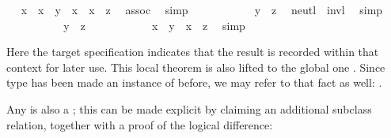 \begin{isabellebody}
\ \isamarkupfalse%
\ {\isachardoublequoteopen}{\isacharparenleft}x\isactrlloc {\isasymdiv}\ \isactrlloc {\isasymotimes}\ x{\isacharparenright}\ \isactrlloc {\isasymotimes}\ y\ {\isacharequal}\ {\isacharparenleft}x\isactrlloc {\isasymdiv}\ \isactrlloc {\isasymotimes}\ x{\isacharparenright}\ \isactrlloc {\isasymotimes}\ z{\isachardoublequoteclose}\ \isamarkupfalse%
\ assoc\ \isamarkupfalse%
\ simp\isanewline
\ \ \ \ \ \ \ \ \isamarkupfalse%
\ \isamarkupfalse%
\ {\isachardoublequoteopen}y\ {\isacharequal}\ z{\isachardoublequoteclose}\ \isamarkupfalse%
\ neutl\ \ invl\ \isamarkupfalse%
\ simp\isanewline
\ \ \ \ \isamarkupfalse%
\isanewline
\ \ \ \ \isamarkupfalse%
\ {\isachardoublequoteopen}y\ {\isacharequal}\ z{\isachardoublequoteclose}\isanewline
\ \ \ \ \ \ \ \ \isamarkupfalse%
\ \isamarkupfalse%
\ {\isachardoublequoteopen}x\ \isactrlloc {\isasymotimes}\ y\ {\isacharequal}\ x\ \isactrlloc {\isasymotimes}\ z{\isachardoublequoteclose}\ \isamarkupfalse%
\ simp\isanewline
\ \ \ \ \isamarkupfalse%
%
\endisatagproof
{\isafoldproof}%
%
\isadelimproof
%
\endisadelimproof
%
\begin{isamarkuptext}%
\noindent Here the  target specification
  indicates that the result is recorded within that context for later
  use.  This local theorem is also lifted to the global one  .  Since type  has been made an instance of
   before, we may refer to that fact as well: .%
\end{isamarkuptext}%
\isamarkuptrue%
%
\isamarkuptrue%
%
\begin{isamarkuptext}%
Any  is also a ;  this
  can be made explicit by claiming an additional subclass relation,
  together with a proof of the logical difference:%

\end{isamarkuptext}
\end{isabellebody}
